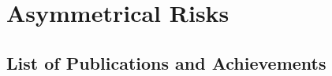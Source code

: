 \documentclass[12pt]{report}
\begin{document}
	\chapter{Asymmetrical Risks}
	\label{ch:asymmetrical_risks}
	
	
	
	
	\clearpage
	\renewcommand{\bibname}{References}
	
	
	
	\begin{appendices}
		\chapter{List of Publications and Achievements}
		\label{app:list_of_publications}
		
		
	\end{appendices}
	
\end{document}
